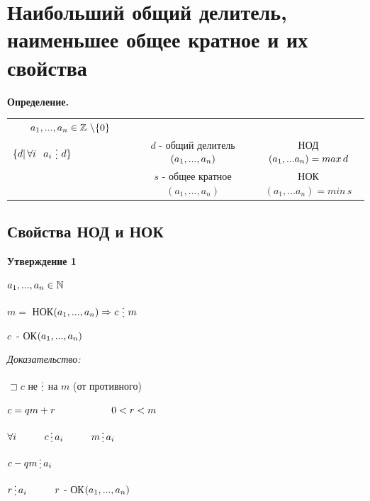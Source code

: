 \documentclass[12pt]{article}
\begin{document}
\section{Наибольший общий делитель, наименьшее общее кратное и их свойства}
\textbf{Определение.}\par
\begin{tabular}{ccc}
    $a_1,...,a_n \in \mathbb{Z} \, \, \backslash \{0\} \vspace{2 ex}$                                                                                                                                   \\
    $\{ d| \, \forall i \, \hspace{2 mm} a_i \, \mathop{\raisebox{-2pt}{\vdots}} \, d\} \hspace{2 cm}$ & $d$ - общий делитель$(a_1,...,a_n) \vspace{2 ex}$ & НОД$(a_1,...a_n) = max \, d \vspace{2 ex}$ \\
                                                                                                       & $s$ - общее кратное$(a_1,...,a_n)$                & НОК$(a_1,...a_n) = min \, s $              \\
\end{tabular}\par

\subsection{Свойства НОД и НОК}
\textbf{Утверждение 1}\par
$a_1,...,a_n \in \mathbb{N} \vspace{1 ex}$\par
$m =$ НОК$(a_1,...,a_n) \Rightarrow c\, \mathop{\raisebox{-2pt}{\vdots}} \,m$\par
$c \,$ - ОК$(a_1,...,a_n) \newline$\par
\it{Доказательство:}\par
$\sqsupset c$ не $\mathop{\raisebox{-2pt}{\vdots}}$ на $m$ (от противного)\par
$c = qm+r \hspace{2 cm} 0 < r < m$\par
$\forall i \hspace{1 cm} c \mathop{\raisebox{-2pt}{\vdots}} a_i \hspace{1 cm} m \mathop{\raisebox{-2pt}{\vdots}} a_i$\par
$c-qm \mathop{\raisebox{-2pt}{\vdots}} a_i$\par
$r \mathop{\raisebox{-2pt}{\vdots}} a_i \hspace{1 cm} r$ - ОК$(a_1,...,a_n) \newline$\par
\end{document}
